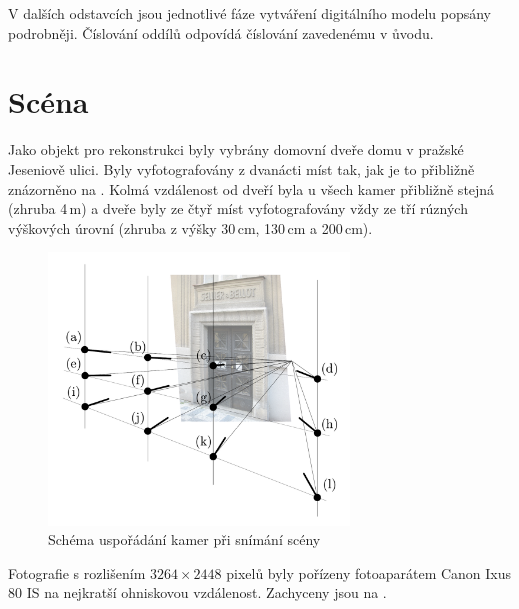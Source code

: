\documentclass[11pt,oneside,a4paper,pdftex]{article}   %
\begin{document}
	V dalších odstavcích jsou jednotlivé fáze vytváření digitálního modelu popsány podrobněji. Číslování
	oddílů odpovídá číslování zavedenému v ůvodu.


\section{Scéna}

	Jako objekt pro rekonstrukci byly vybrány domovní dveře domu v pražské Jeseniově ulici. Byly
	vyfotografovány z dvanácti míst tak, jak je to přibližně znázorněno na .
	Kolmá vzdálenost od dveří byla u všech kamer přibližně stejná (zhruba 4\,m) a dveře byly ze čtyř
	míst vyfotografovány vždy ze tří rúzných výškových úrovní (zhruba z výšky 30\,cm, 130\,cm a
	200\,cm).
		\begin{figure}[htb]
			\centering
			\includegraphics[width=8cm]{pictures/usporadani_kamer.pdf}
			\caption{Schéma uspořádání kamer při snímání scény}
			\label{fig:usporadaniKamer}
		\end{figure}
	Fotografie s rozlišením $3264\times2448$ pixelů byly pořízeny fotoaparátem Canon Ixus 80
	IS na nejkratší ohniskovou vzdálenost. Zachyceny jsou na .
\end{document}

